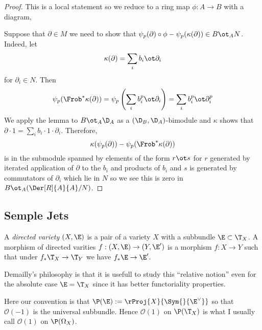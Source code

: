 \documentclass[12pt]{article}
\newcommand{\cO}{\mathcal{O}}
\begin{document}
\begin{proof}
This is a local statement so we reduce to a ring map $\phi : A \to B$ with a diagram,
\begin{center}
\end{center}
Suppose that $\partial \in M$ we need to show that $\psi_p(\partial) \circ \phi - \psi_p(\kappa(\partial)) \in B \ot_A N$. Indeed, let
\[ \kappa(\partial) = \sum_i b_i \ot \partial_i \]
for $\partial_i \in N$. Then 
\[ \psi_p(\Frob^* \kappa(\partial)) = \psi_p \left(\sum_i b_i^p \ot \partial_i \right) = \sum_i b_i^p \ot \partial_i^p \]
We apply the lemma to $B \ot_A \D_A$ as a $(\D_B, \D_A)$-bimodule and $\kappa$ shows that $\partial \cdot 1 = \sum_i b_i \cdot 1 \cdot \partial_i$. Therefore,
\[ \kappa(\psi_p(\partial)) - \psi_p(\Frob^* \kappa(\partial)) \]
is in the submodule spanned by elements of the form $r \ot s$ for $r$ generated by iterated application of $\partial$ to the $b_i$ and products of $b_i$ and $s$ is generated by commutators of $\partial_i$ which lie in $N$ so we see this is zero in $B \ot_A (\Der[R]{A}{A} / N)$.
\end{proof}

\subsection{Semple Jets}

\begin{defn}
A \textit{directed variety} $(X, \E)$ is a pair of a variety $X$ with a subbundle $\E \subset \T_X$. A morphism of directed varities $f : (X, \E) \to (Y, \E')$ is a morphism $f : X \to Y$ such that under $f_* \T_X \to \T_Y$ we have $f_* \E \to \E'$.
\end{defn}

\begin{rmk}
Demailly's philosophy is that it is usefull to study this ``relative notion'' even for the absolute case $\E = \T_X$ since it has better functoriality properties.
\end{rmk}

\begin{rmk}
Here our convention is that $\P(\E) := \rProj{X}{\Sym{}{\E^\vee}}$ so that $\cO(-1)$ is the universal subbundle. Hence $\cO(1)$ on $\P(\T_X)$ is what I usually call $\cO(1)$ on $\P(\Omega_X)$.
\end{rmk}
\end{document}

